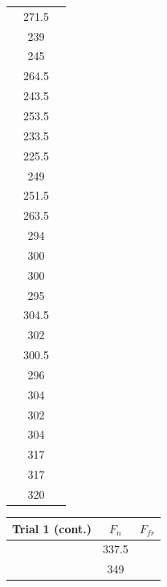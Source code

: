 \documentclass[12pt]{article}
\begin{document}
\begin{table}
\begin{tabular}[t]{| c  c  c |}
                & 271.5         &           \\
                & 239           &           \\
                & 245           &           \\
                & 264.5         &           \\
                & 243.5         &           \\
                & 253.5         &           \\
                & 233.5         &           \\
                & 225.5         &           \\
                & 249           &           \\
                & 251.5         &           \\
                & 263.5         &           \\
                & 294           &           \\
                & 300           &           \\
                & 300           &           \\
                & 295           &           \\
                & 304.5         &           \\
                & 302           &           \\
                & 300.5         &           \\
                & 296           &           \\
                & 304           &           \\
                & 302           &           \\
                & 304           &           \\
                & 317           &           \\
                & 317           &           \\
                & 320           &           \\
                \hline
    \end{tabular}
    \hfill
    \begin{tabular}[t]{| c  c  c |}
        \hline
        Trial 1 (cont.) & $F_{n}$       & $F_{fr}$  \\
        \hline
                & 337.5         &           \\
                & 349           &           \\

\end{tabular}
\end{table}
\end{document}

